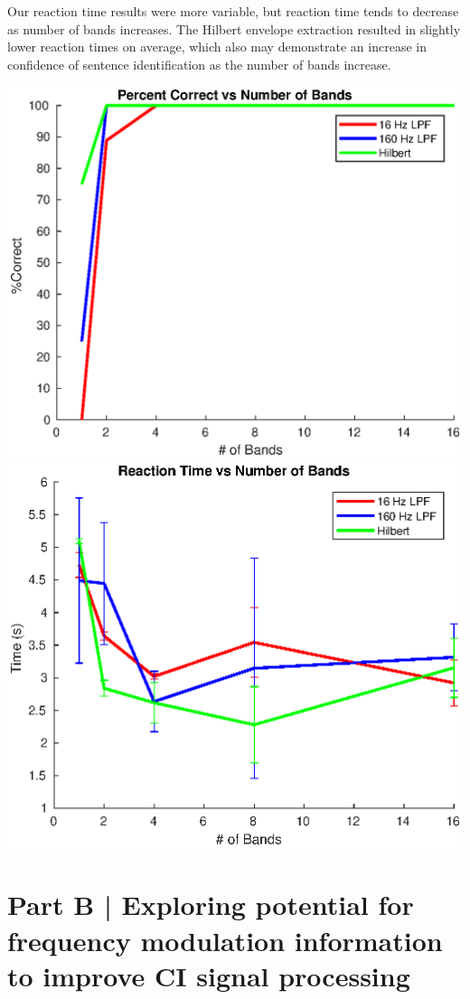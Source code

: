 \documentclass[9pt]{extarticle}
\begin{document}
\begin{enumerate}[label = \alph*) ]
Our reaction time results were more variable, but reaction time tends to decrease as number of bands increases. The Hilbert envelope extraction resulted in slightly lower reaction times on average, which also may demonstrate an increase in confidence of sentence identification as the number of bands increase. 

\begin{center}
\includegraphics[width = .47\textwidth]{figA1}
\includegraphics[width = .47\textwidth]{figA2}
\end{center}

\end{enumerate}


\section{Part B | Exploring potential for frequency modulation information to improve CI signal processing}
\end{document}
